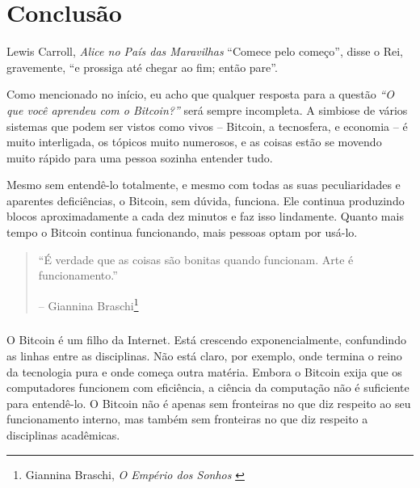 
\label{ch:conclusion}

\chapter*{Conclusão}


\begin{chapquote}{Lewis Carroll, \textit{Alice no País das Maravilhas}}
\enquote{Comece pelo começo}, disse o Rei, gravemente, \enquote{e prossiga até chegar ao fim; então pare}.
\end{chapquote}

Como mencionado no início, eu acho que qualquer resposta para a questão 
\textit{“O que você aprendeu com o Bitcoin?”} será sempre incompleta. 
A simbiose de vários sistemas que podem ser vistos como vivos -- Bitcoin, 
a tecnosfera, e economia -- é muito interligada, os tópicos muito numerosos, e 
as coisas estão se movendo muito rápido para uma pessoa sozinha entender tudo.

Mesmo sem entendê-lo totalmente, e mesmo com todas as suas peculiaridades e aparentes deficiências, o Bitcoin, sem dúvida, funciona. Ele continua produzindo blocos aproximadamente a cada dez minutos e faz isso lindamente. Quanto mais tempo o Bitcoin continua funcionando, mais pessoas optam por usá-lo.

\begin{quotation}\begin{samepage}
\enquote{É verdade que as coisas são bonitas quando funcionam. Arte é funcionamento.}
\begin{flushright} -- Giannina Braschi\footnote{Giannina Braschi, \textit{O Empério dos Sonhos} \cite{braschi2011empire}}
\end{flushright}\end{samepage}\end{quotation}

\paragraph{}
O Bitcoin é um filho da Internet. Está crescendo exponencialmente, confundindo as linhas entre as disciplinas. Não está claro, por exemplo, onde termina o reino da tecnologia pura e onde começa outra matéria. Embora o Bitcoin exija que os computadores funcionem com eficiência, a ciência da computação não é suficiente para entendê-lo. O Bitcoin não é apenas sem fronteiras no que diz respeito ao seu funcionamento interno, mas também sem fronteiras no que diz respeito a disciplinas acadêmicas.

